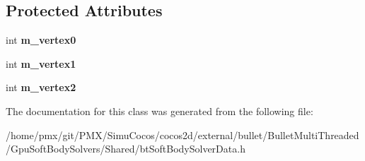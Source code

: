 \subsection*{Protected Attributes}
\begin{DoxyCompactItemize}
\item 
\mbox{\label{classbtSoftBodyTriangleData_1_1TriangleDescription_a9898bfc20610b47b5a8a12b4a3475344}} 
int {\bfseries m\+\_\+vertex0}
\item 
\mbox{\label{classbtSoftBodyTriangleData_1_1TriangleDescription_a67bbe48a955df79913763ab6c400e0f3}} 
int {\bfseries m\+\_\+vertex1}
\item 
\mbox{\label{classbtSoftBodyTriangleData_1_1TriangleDescription_a97abfb5481fcdfdca71044fee127a58b}} 
int {\bfseries m\+\_\+vertex2}
\end{DoxyCompactItemize}


The documentation for this class was generated from the following file\+:\begin{DoxyCompactItemize}
\item 
/home/pmx/git/\+P\+M\+X/\+Simu\+Cocos/cocos2d/external/bullet/\+Bullet\+Multi\+Threaded/\+Gpu\+Soft\+Body\+Solvers/\+Shared/bt\+Soft\+Body\+Solver\+Data.\+h\end{DoxyCompactItemize}
